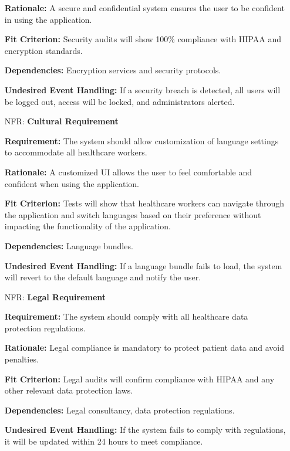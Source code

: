 \documentclass[12pt]{article}
\newcounter{nfrnum} %
\begin{document}
\begin{itemize}
    \textbf{Rationale:} A secure and confidential system ensures the user to be confident in using the application.

    \textbf{Fit Criterion:} Security audits will show 100\% compliance with HIPAA and encryption standards.  

    \textbf{Dependencies:} Encryption services and security protocols.  

    \textbf{Undesired Event Handling:} If a security breach is detected, all users will be logged out, access will be locked, and administrators alerted.

\item[NFR\refstepcounter{nfrnum}\thenfrnum \label{NFR_Cultural}:] \textbf{Cultural Requirement}

    \textbf{Requirement:} The system should allow customization of language settings to accommodate all healthcare workers.

    \textbf{Rationale:} A customized UI allows the user to feel comfortable and confident when using the application.

    \textbf{Fit Criterion:} Tests will show that healthcare workers can navigate through the application and switch languages based on their preference without impacting the functionality of the application.

    \textbf{Dependencies:} Language bundles.  

    \textbf{Undesired Event Handling:} If a language bundle fails to load, the system will revert to the default language and notify the user.

\item[NFR\refstepcounter{nfrnum}\thenfrnum \label{NFR_Legal}:] \textbf{Legal Requirement}

    \textbf{Requirement:} The system should comply with all healthcare data protection regulations. 

    \textbf{Rationale:} Legal compliance is mandatory to protect patient data and avoid penalties.  

    \textbf{Fit Criterion:} Legal audits will confirm compliance with HIPAA and any other relevant data protection laws.  

    \textbf{Dependencies:} Legal consultancy, data protection regulations.  

    \textbf{Undesired Event Handling:} If the system fails to comply with regulations, it will be updated within 24 hours to meet compliance.

\end{itemize}
\end{document}
